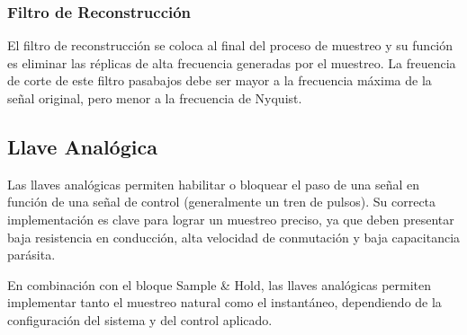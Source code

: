 \subsubsection{Filtro de Reconstrucción}
El filtro de reconstrucción se coloca al final del proceso de muestreo y su función es eliminar las réplicas de alta frecuencia generadas por el muestreo.
La freuencia de corte de este filtro pasabajos debe ser mayor a la frecuencia máxima de la señal original, pero menor a la frecuencia de Nyquist.
\subsection{Llave Analógica}
Las llaves analógicas permiten habilitar o bloquear el paso de una señal en función 
de una señal de control (generalmente un tren de pulsos).
Su correcta implementación es clave para lograr un muestreo preciso,
ya que deben presentar baja resistencia en conducción, alta velocidad
de conmutación y baja capacitancia parásita.

En combinación con el bloque Sample \& Hold, las llaves analógicas permiten
implementar tanto el muestreo natural como el instantáneo, 
dependiendo de la configuración del sistema y del control aplicado.


